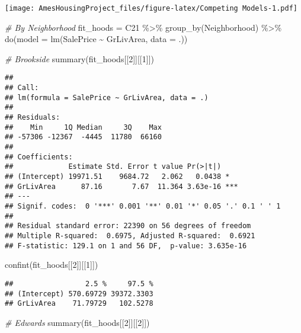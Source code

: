 \documentclass[
]{article}
\newenvironment{Shaded}{\begin{snugshade}}{\end{snugshade}}
\newcommand{\AttributeTok}[1]{\textcolor[rgb]{0.77,0.63,0.00}{#1}}
\newcommand{\CommentTok}[1]{\textcolor[rgb]{0.56,0.35,0.01}{\textit{#1}}}
\newcommand{\DecValTok}[1]{\textcolor[rgb]{0.00,0.00,0.81}{#1}}
\newcommand{\FunctionTok}[1]{\textcolor[rgb]{0.00,0.00,0.00}{#1}}
\newcommand{\NormalTok}[1]{#1}
\newcommand{\OtherTok}[1]{\textcolor[rgb]{0.56,0.35,0.01}{#1}}
\newcommand{\SpecialCharTok}[1]{\textcolor[rgb]{0.00,0.00,0.00}{#1}}
\begin{document}
\texttt{[image: AmesHousingProject\_files/figure-latex/Competing Models-1.pdf]}

\begin{Shaded}
\begin{Highlighting}[]
\CommentTok{\# By Neighborhood}
\NormalTok{fit\_hoods }\OtherTok{=}\NormalTok{ C21 }\SpecialCharTok{\%\textgreater{}\%} \FunctionTok{group\_by}\NormalTok{(Neighborhood) }\SpecialCharTok{\%\textgreater{}\%} \FunctionTok{do}\NormalTok{(}\AttributeTok{model =} \FunctionTok{lm}\NormalTok{(SalePrice }\SpecialCharTok{\textasciitilde{}}\NormalTok{ GrLivArea, }\AttributeTok{data =}\NormalTok{ .))}

\CommentTok{\# Brookside}
\FunctionTok{summary}\NormalTok{(fit\_hoods[[}\DecValTok{2}\NormalTok{]][[}\DecValTok{1}\NormalTok{]])}
\end{Highlighting}
\end{Shaded}

\begin{verbatim}
## 
## Call:
## lm(formula = SalePrice ~ GrLivArea, data = .)
## 
## Residuals:
##    Min     1Q Median     3Q    Max 
## -57306 -12367  -4445  11780  66160 
## 
## Coefficients:
##             Estimate Std. Error t value Pr(>|t|)    
## (Intercept) 19971.51    9684.72   2.062   0.0438 *  
## GrLivArea      87.16       7.67  11.364 3.63e-16 ***
## ---
## Signif. codes:  0 '***' 0.001 '**' 0.01 '*' 0.05 '.' 0.1 ' ' 1
## 
## Residual standard error: 22390 on 56 degrees of freedom
## Multiple R-squared:  0.6975, Adjusted R-squared:  0.6921 
## F-statistic: 129.1 on 1 and 56 DF,  p-value: 3.635e-16
\end{verbatim}

\begin{Shaded}
\begin{Highlighting}[]
\FunctionTok{confint}\NormalTok{(fit\_hoods[[}\DecValTok{2}\NormalTok{]][[}\DecValTok{1}\NormalTok{]])}
\end{Highlighting}
\end{Shaded}

\begin{verbatim}
##                 2.5 %     97.5 %
## (Intercept) 570.69729 39372.3303
## GrLivArea    71.79729   102.5278
\end{verbatim}

\begin{Shaded}
\begin{Highlighting}[]
\CommentTok{\# Edwards}
\FunctionTok{summary}\NormalTok{(fit\_hoods[[}\DecValTok{2}\NormalTok{]][[}\DecValTok{2}\NormalTok{]])}
\end{Highlighting}
\end{Shaded}
\end{document}
